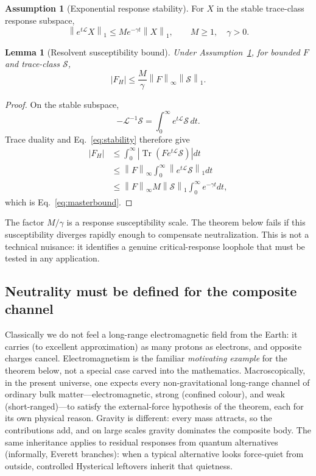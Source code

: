 \documentclass[11pt]{article}
\newtheorem{lemma}[theorem]{Lemma}
\theoremstyle{definition}
\newtheorem{assumption}[theorem]{Assumption}
\theoremstyle{remark}
\newcommand{\norm}[1]{\left\lVert #1\right\rVert}
\newcommand{\Tr}{\operatorname{Tr}}
\begin{document}
\begin{assumption}[Exponential response stability]\label{ass:stability}
For $X$ in the stable trace-class response subspace,
\begin{equation}
 \norm{e^{t\mathcal L}X}_1\le M e^{-\gamma t}\norm{X}_1,
 \qquad M\ge1,\quad\gamma>0.
 \label{eq:stability}
\end{equation}
\end{assumption}

\begin{lemma}[Resolvent susceptibility bound]\label{lem:resolvent}
Under Assumption~\ref{ass:stability}, for bounded $F$ and trace-class $\mathcal S$,
\begin{equation}
 |F_H|\le \frac{M}{\gamma}\norm{F}_\infty\norm{\mathcal S}_1.
 \label{eq:masterbound}
\end{equation}
\end{lemma}
\begin{proof}
On the stable subspace,
\begin{equation}
 -\mathcal L^{-1}\mathcal S=\int_0^\infty e^{t\mathcal L}\mathcal S\,dt.
\end{equation}
Trace duality and Eq.~\eqref{eq:stability} therefore give
\begin{align}
 |F_H|
 &\le\int_0^\infty\left|\Tr(F e^{t\mathcal L}\mathcal S)\right|dt\\
 &\le\norm F_\infty\int_0^\infty\norm{e^{t\mathcal L}\mathcal S}_1dt\\
 &\le\norm F_\infty M\norm{\mathcal S}_1\int_0^\infty e^{-\gamma t}dt,
\end{align}
which is Eq.~\eqref{eq:masterbound}.
\end{proof}

The factor $M/\gamma$ is a response susceptibility scale.  The theorem below fails if this susceptibility diverges rapidly enough to compensate neutralization.  This is not a technical nuisance: it identifies a genuine critical-response loophole that must be tested in any application.

\subsection{Neutrality must be defined for the composite channel}
Classically we do not feel a long-range electromagnetic field from the Earth: it carries (to excellent approximation) as many protons as electrons, and opposite charges cancel.
Electromagnetism is the familiar \emph{motivating example} for the theorem below, not a special case carved into the mathematics.
Macroscopically, in the present universe, one expects every non-gravitational long-range channel of ordinary bulk matter---electromagnetic, strong (confined colour), and weak (short-ranged)---to satisfy the external-force hypothesis of the theorem, each for its own physical reason.
Gravity is different: every mass attracts, so the contributions add, and on large scales gravity dominates the composite body.
The same inheritance applies to residual responses from quantum alternatives (informally, Everett branches): when a typical alternative looks force-quiet from outside, controlled Hysterical leftovers inherit that quietness.
\end{document}
